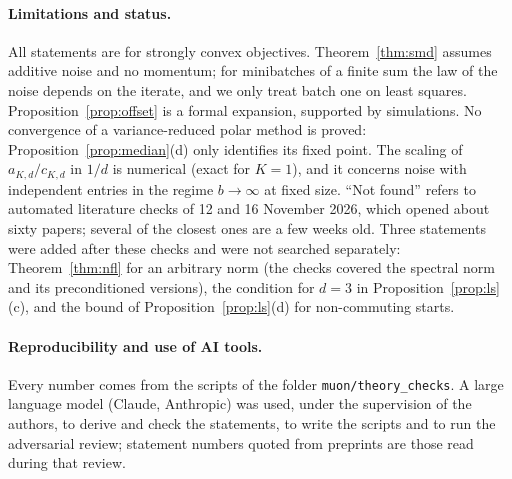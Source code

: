 \documentclass[11pt]{article}
\begin{document}
\paragraph{Limitations and status.} All statements are for strongly convex objectives. Theorem~\ref{thm:smd} assumes
additive noise and no momentum; for minibatches of a finite sum the law of the noise depends on the iterate, and we
only treat batch one on least squares. Proposition~\ref{prop:offset} is a formal expansion, supported by simulations.
No convergence of a variance-reduced polar method is proved: Proposition~\ref{prop:median}(d) only identifies its
fixed point. The scaling of $a_{K,d}/c_{K,d}$ in $1/d$ is numerical (exact for $K=1$), and it concerns noise with
independent entries in the regime $b\to\infty$ at fixed size. ``Not found'' refers to automated literature checks of
12 and 16 November 2026, which opened about sixty papers; several of the closest ones are a few weeks old. Three
statements were added after these checks and were not searched separately: Theorem~\ref{thm:nfl} for an arbitrary
norm (the checks covered the spectral norm and its preconditioned versions), the condition for $d=3$ in
Proposition~\ref{prop:ls}(c), and the bound of Proposition~\ref{prop:ls}(d) for non-commuting starts.

\paragraph{Reproducibility and use of AI tools.} Every number comes from the scripts of the folder
\texttt{muon/theory\_checks}. A large language model (Claude, Anthropic) was used, under the supervision of the
authors, to derive and check the statements, to write the scripts and to run the adversarial review; statement
numbers quoted from preprints are those read during that review.

{\footnotesize


}
\end{document}
